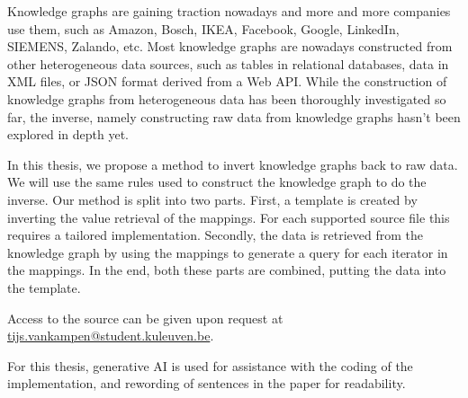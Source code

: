 Knowledge graphs are gaining traction nowadays and more and more companies use them, such as Amazon, Bosch, IKEA, Facebook, Google, LinkedIn, SIEMENS, Zalando, etc. Most knowledge graphs are nowadays constructed from other heterogeneous data sources, such as tables in relational databases, data in XML files, or JSON format derived from a Web API. While the construction of knowledge graphs from heterogeneous data has been thoroughly investigated so far, the inverse, namely constructing raw data from knowledge graphs hasn't been explored in depth yet. 

In this thesis, we propose a method to invert knowledge graphs back to raw data. We will use the same rules used to construct the knowledge graph to do the inverse. Our method is split into two parts. First, a template is created by inverting the value retrieval of the mappings. For each supported source file this requires a tailored implementation. Secondly, the data is retrieved from the knowledge graph by using the mappings to generate a query for each iterator in the mappings. In the end, both these parts are combined, putting the data into the template.

Access to the source can be given upon request at \href{mailto:tijs.vankampen@student.kuleuven.be}{tijs.vankampen@student.kuleuven.be}. 

For this thesis, generative AI is used for assistance with the coding of the implementation, and rewording of sentences in the paper for readability.







